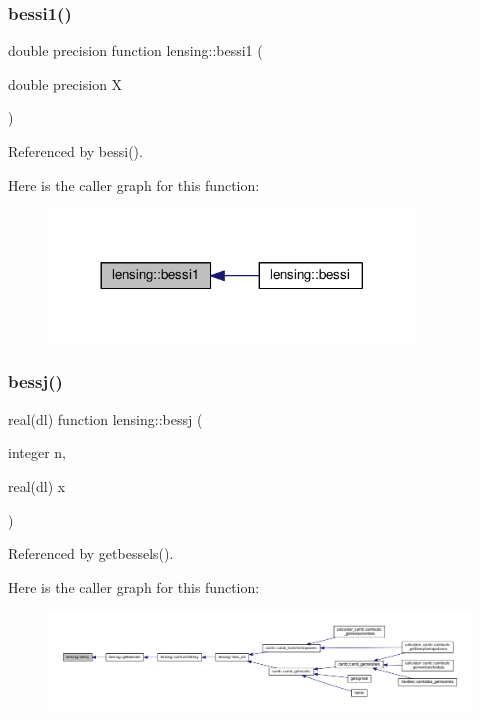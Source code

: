 \subsubsection{\texorpdfstring{bessi1()}{bessi1()}}
{\footnotesize\ttfamily double precision function lensing\+::bessi1 (\begin{DoxyParamCaption}\item[{double precision}]{X }\end{DoxyParamCaption})\hspace{0.3cm}{\ttfamily [private]}}



Referenced by bessi().

Here is the caller graph for this function\+:
\nopagebreak
\begin{figure}[H]
\begin{center}
\leavevmode
\includegraphics[width=276pt]{namespacelensing_a2474483511401e2796af7b20caf6796d_icgraph}
\end{center}
\end{figure}
\mbox{\label{namespacelensing_a53ac785c7d5c53f22122c476b62c4368}} 
\subsubsection{\texorpdfstring{bessj()}{bessj()}}
{\footnotesize\ttfamily real(dl) function lensing\+::bessj (\begin{DoxyParamCaption}\item[{integer}]{n,  }\item[{real(dl)}]{x }\end{DoxyParamCaption})\hspace{0.3cm}{\ttfamily [private]}}



Referenced by getbessels().

Here is the caller graph for this function\+:
\nopagebreak
\begin{figure}[H]
\begin{center}
\leavevmode
\includegraphics[width=350pt]{namespacelensing_a53ac785c7d5c53f22122c476b62c4368_icgraph}
\end{center}
\end{figure}
\mbox{\label{namespacelensing_a8fca1155759235e997ecc5ebcb8273bc}} 
